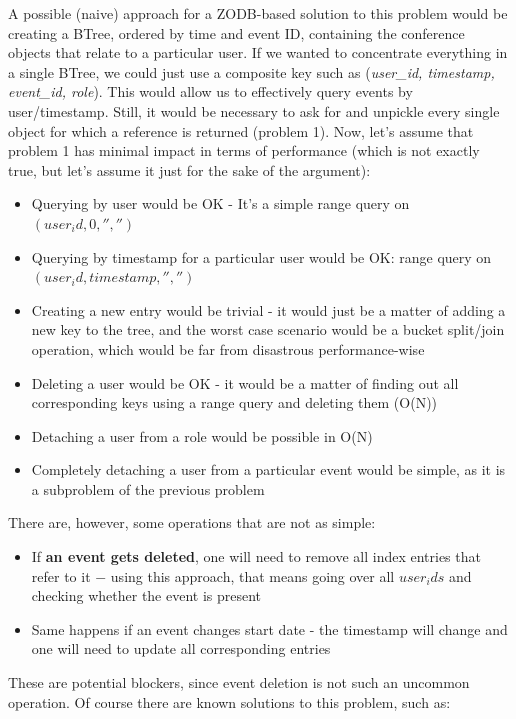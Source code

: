 A possible (naive) approach for a ZODB-based solution to this problem would be creating a BTree, ordered by time and event ID, containing the conference objects that relate to a particular user. If we wanted to concentrate everything in a single BTree, we could just use a composite key such as (\textit{user\_id, timestamp, event\_id, role}). This would allow us to effectively query events by user/timestamp. Still, it would be necessary to ask for and unpickle every single object for which a reference is returned (problem 1). Now, let's assume that problem 1 has minimal impact in terms of performance (which is not exactly true, but let's assume it just for the sake of the argument):

\begin{itemize}
  \item Querying by user would be OK - It's a simple range query on $(user_id, 0, '', '')$
  \item Querying by timestamp for a particular user would be OK: range query on $(user_id, timestamp, '', '')$
  \item Creating a new entry would be trivial - it would just be a matter of adding a new key to the tree, and the worst case scenario would be a bucket split/join operation, which would be far from disastrous performance-wise
  \item Deleting a user would be OK - it would be a matter of finding out all corresponding keys using a range query and deleting them (O(N))
  \item Detaching a user from a role would be possible in O(N)
  \item Completely detaching a user from a particular event would be simple, as it is a subproblem of the previous problem
\end{itemize}

There are, however, some operations that are not as simple:

\begin{itemize}
  \item If \textbf{an event gets deleted}, one will need to remove all index entries that refer to it $-$ using this approach, that means going over all $user_ids$ and checking whether the event is present
  \item Same happens if an event changes start date - the timestamp will change and one will need to update all corresponding entries
\end{itemize}

These are potential blockers, since event deletion is not such an uncommon operation. Of course there are known solutions to this problem, such as:


